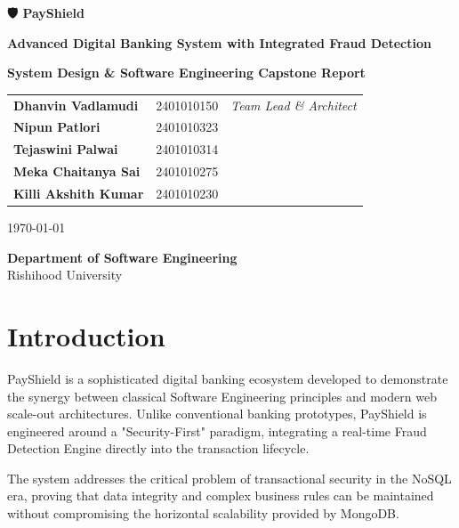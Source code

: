 \documentclass[11pt,a4paper]{article}
\begin{document}
\begin{titlepage}
    \centering
    \vspace*{2cm}
    {\Huge \textbf{🛡️ PayShield} \par}
    \vspace{0.5cm}
    {\Large \textbf{Advanced Digital Banking System with Integrated Fraud Detection} \par}
    \vspace{1.5cm}
    {\large \textbf{System Design \& Software Engineering Capstone Report} \par}
    \vfill
    \begin{tcolorbox}[colback=gray!5,colframe=primary,arc=0mm,title=Team Composition]
        \centering
        \begin{tabular}{l l l}
            \textbf{Dhanvin Vadlamudi} & 2401010150 & \textit{Team Lead \& Architect} \\
            \textbf{Nipun Patlori} & 2401010323 &  \\
            \textbf{Tejaswini Palwai} & 2401010314 &  \\
            \textbf{Meka Chaitanya Sai} & 2401010275 &  \\
            \textbf{Killi Akshith Kumar} & 2401010230 &  \\
        \end{tabular}
    \end{tcolorbox}
    \vfill
    \large \today \par
    \vspace{1cm}
    \textbf{Department of Software Engineering} \\
    Rishihood University
\end{titlepage}

\newpage
\tableofcontents
\newpage

\section{Introduction}
PayShield is a sophisticated digital banking ecosystem developed to demonstrate the synergy between classical Software Engineering principles and modern web scale-out architectures. Unlike conventional banking prototypes, PayShield is engineered around a "Security-First" paradigm, integrating a real-time Fraud Detection Engine directly into the transaction lifecycle.

The system addresses the critical problem of transactional security in the NoSQL era, proving that data integrity and complex business rules can be maintained without compromising the horizontal scalability provided by MongoDB.
\end{document}
